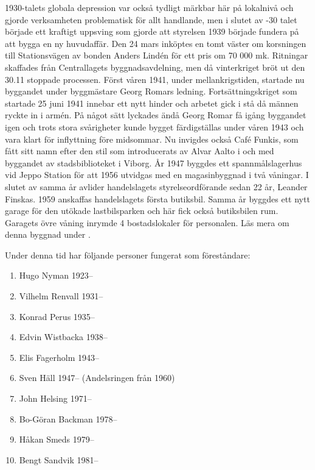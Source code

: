 1930-talets globala depression var också tydligt märkbar här på lokalnivå och gjorde verksamheten problematisk för allt handlande, men i slutet av -30 talet började ett kraftigt uppsving som gjorde att styrelsen 1939 började fundera på att bygga en ny huvudaffär. Den 24 mars inköptes en tomt väster om korsningen till Stationsvägen av bonden Anders Lindén för ett pris om 70 000 mk. Ritningar skaffades från Centrallagets byggnadsavdelning, men då vinterkriget bröt ut den 30.11 stoppade processen. Först våren 1941, under mellankrigstiden, startade nu byggandet under byggmästare Georg Romars ledning. Fortsättningskriget som startade 25 juni 1941 innebar ett nytt hinder och arbetet gick i stå då männen ryckte in i armén. På något sätt lyckades ändå Georg Romar få igång byggandet igen och trots stora svårigheter kunde bygget färdigställas under våren 1943 och vara klart för inflyttning före midsommar. Nu invigdes också Café Funkis, som fått sitt namn efter den stil som introducerats av Alvar Aalto i och med byggandet av stadsbiblioteket i Viborg.
År 1947 byggdes ett spannmålslagerhus vid Jeppo Station för att 1956 utvidgas med en magasinbyggnad i två våningar. I slutet av samma år avlider handelslagets styrelseordförande sedan 22 år, Leander Finskas. 1959 anskaffas handelslagets första butiksbil. Samma år byggdes ett nytt garage för den utökade lastbilsparken och här fick också butiksbilen rum. Garagets övre våning inrymde 4 bostadslokaler för personalen. Läs mera om denna byggnad under .

Under denna tid har följande personer fungerat som föreståndare:
\begin{enumerate}
  \item Hugo Nyman        1923--
  \item Vilhelm Renvall   1931--
  \item Konrad Perus      1935--
  \item Edvin Wistbacka   1938--
  \item Elis Fagerholm    1943--
  \item Sven Häll         1947-- (Andelsringen från 1960)
  \item John Helsing      1971--
  \item Bo-Göran Backman  1978--
  \item Håkan Smeds       1979--
  \item Bengt Sandvik     1981--
\end{enumerate}

